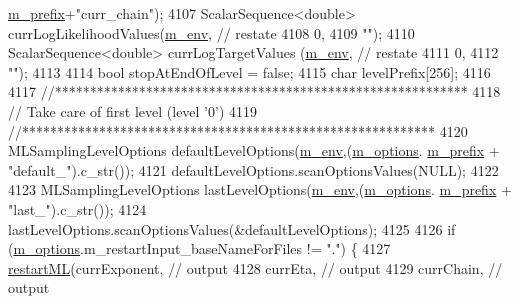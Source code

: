 \begin{DoxyCode}
      \hyperlink{class_q_u_e_s_o_1_1_m_l_sampling_options_a1d3d48598e0b59b46337ce66a52671a5}{m\_prefix}+\textcolor{stringliteral}{"curr\_chain"});
4107   ScalarSequence<double>     currLogLikelihoodValues(\hyperlink{class_q_u_e_s_o_1_1_m_l_sampling_a13f1ca4fe9f94822fe572a743eaced1d}{m\_env},         \textcolor{comment}{// restate}
4108                                                             0,
4109                                                             \textcolor{stringliteral}{""});
4110   ScalarSequence<double>     currLogTargetValues    (\hyperlink{class_q_u_e_s_o_1_1_m_l_sampling_a13f1ca4fe9f94822fe572a743eaced1d}{m\_env},         \textcolor{comment}{// restate}
4111                                                             0,
4112                                                             \textcolor{stringliteral}{""});
4113 
4114   \textcolor{keywordtype}{bool} stopAtEndOfLevel = \textcolor{keyword}{false};
4115   \textcolor{keywordtype}{char} levelPrefix[256];
4116 
4117   \textcolor{comment}{//***********************************************************}
4118   \textcolor{comment}{// Take care of first level (level '0')}
4119   \textcolor{comment}{//***********************************************************}
4120   MLSamplingLevelOptions defaultLevelOptions(\hyperlink{class_q_u_e_s_o_1_1_m_l_sampling_a13f1ca4fe9f94822fe572a743eaced1d}{m\_env},(\hyperlink{class_q_u_e_s_o_1_1_m_l_sampling_af8504cc57ec72b3c52833826b2bfff8e}{m\_options}.
      \hyperlink{class_q_u_e_s_o_1_1_m_l_sampling_options_a1d3d48598e0b59b46337ce66a52671a5}{m\_prefix} + \textcolor{stringliteral}{"default\_"}).c\_str());
4121   defaultLevelOptions.scanOptionsValues(NULL);
4122 
4123   MLSamplingLevelOptions lastLevelOptions(\hyperlink{class_q_u_e_s_o_1_1_m_l_sampling_a13f1ca4fe9f94822fe572a743eaced1d}{m\_env},(\hyperlink{class_q_u_e_s_o_1_1_m_l_sampling_af8504cc57ec72b3c52833826b2bfff8e}{m\_options}.
      \hyperlink{class_q_u_e_s_o_1_1_m_l_sampling_options_a1d3d48598e0b59b46337ce66a52671a5}{m\_prefix} + \textcolor{stringliteral}{"last\_"}).c\_str());
4124   lastLevelOptions.scanOptionsValues(&defaultLevelOptions);
4125 
4126   \textcolor{keywordflow}{if} (\hyperlink{class_q_u_e_s_o_1_1_m_l_sampling_af8504cc57ec72b3c52833826b2bfff8e}{m\_options}.m\_restartInput\_baseNameForFiles != \textcolor{stringliteral}{"."}) \{
4127     \hyperlink{class_q_u_e_s_o_1_1_m_l_sampling_aa387be291dd763ce001ea769e87266c4}{restartML}(currExponent,            \textcolor{comment}{// output}
4128               currEta,                 \textcolor{comment}{// output}
4129               currChain,               \textcolor{comment}{// output}

\end{DoxyCode}
